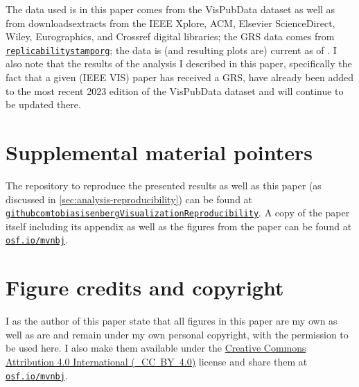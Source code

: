 \documentclass[conference]{vgtc}                     %
\newcommand{\osfid}{mvnbj}
\begin{document}
The data used is in this paper comes from the VisPubData dataset \cite{Isenberg:2017:VMC} as well as from down\-loads\discretionary{/}{}{/}ex\-tracts from the IEEE Xplore, ACM, Elsevier ScienceDirect, Wiley, Eurographics, and Crossref digital libraries; the GRS data comes from \href{https://www.replicabilitystamp.org/}{\texttt{replicabilitystamporg}}; the data is (and resulting plots are) current as of \GrsiDataCurrentAsOf{}. I also note that the results of the analysis I described in this paper, specifically the fact that a given (IEEE VIS) paper has received a GRS, have already been added to the most recent 2023 edition of the VisPubData dataset \cite{Isenberg:2017:VMC} and will continue to be updated there.

\section*{Supplemental material pointers}
\label{sec:supplemental_materials}

The repository to reproduce the presented results as well as this paper (as discussed in \autoref{sec:analysis-reproducibility}) can be found at \href{https://github.com/tobiasisenberg/Visualization-Reproducibility}{\texttt{githubcom\discretionary{/}{}{/}tobiasisenberg\discretionary{/}{}{/}Visualization\discretionary{}{-}{-}Reproducibility}}. A copy of the paper itself including its appendix as well as the figures from the paper can be found at \href{https://osf.io/\osfid/}{\texttt{osf.io/\osfid}}.

\section*{Figure credits and copyright}
\label{sec:figure_credits}

I as the author of this paper state that all figures in this paper are my own as well as are and remain under my own personal copyright, with the permission to be used here. I also make them available under the \href{https://creativecommons.org/licenses/by/4.0/}{Creative Commons At\-tri\-bu\-tion 4.0 International (\ccLogo\,\ccAttribution\ \mbox{CC BY 4.0})} license and share them at \href{https://osf.io/\osfid/}{\texttt{osf.io/\osfid}}.

\end{document}
